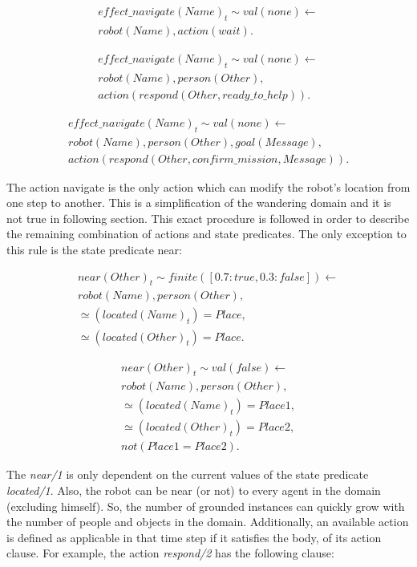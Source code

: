 \begin{align*} 
    effect\_navigate(Name)_t \sim val(none) \leftarrow \\
	robot(Name), action(wait).
\end{align*}

\begin{align*} 
    effect\_navigate(Name)_t \sim val(none) \leftarrow \\
	robot(Name), person(Other), \\
    action(respond(Other, ready\_to\_help)).
\end{align*}

\begin{align*} 
    effect\_navigate(Name)_t \sim val(none) \leftarrow \\
	robot(Name), person(Other), goal(Message), \\
    action(respond(Other, confirm\_mission, Message)).
\end{align*}

The action navigate is the only action which can modify the robot's location from one step 
to another. This is a simplification of the wandering domain and it is not true in following 
section.
This exact procedure is followed in order to describe the remaining combination of actions 
and state predicates. 
The only exception to this rule is the state predicate near:

\begin{align*} 
    near(Other)_t \sim finite([0.7:true, 0.3:false]) \leftarrow \\
	robot(Name), person(Other), \\
    \simeq(located(Name)_t) = Place, \\
    \simeq(located(Other)_t) = Place.
\end{align*}

\begin{align*} 
    near(Other)_t \sim val(false) \leftarrow \\
	robot(Name), person(Other), \\
    \simeq(located(Name)_t) = Place1, \\
    \simeq(located(Other)_t) = Place2, \\
    not(Place1 = Place2).
\end{align*}

The \textit{near/1} is only dependent on the current values of the state predicate \textit{located/1}.
Also, the robot can be near (or not) to every agent in the domain (excluding himself). So, the number of 
grounded instances can quickly grow with the number of people and objects in the domain.
Additionally, an available action is defined as applicable in that time step if it satisfies the body, of its 
action clause. For example, the action \textit{respond/2} has the following clause:

